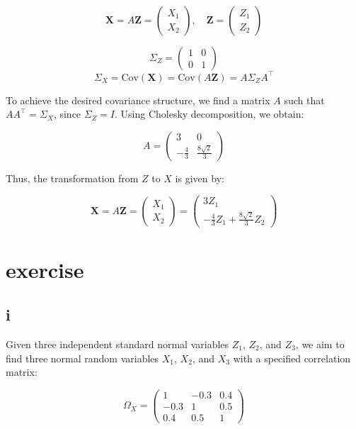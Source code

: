 \documentclass{article}
\begin{document}
\[
    \mathbf{X} = A \mathbf Z = \begin{pmatrix} X_1 \\ X_2 \end{pmatrix}, \quad \mathbf Z = \begin{pmatrix} Z_1 \\ Z_2 \end{pmatrix}
\]

\[
    \Sigma_Z = \begin{pmatrix} 1 & 0 \\ 0 & 1 \end{pmatrix}
\]
\[
    \Sigma_X = \text{Cov}(\mathbf X) = \text{Cov}(A \mathbf Z) = A \Sigma_Z A^\top
\]

To achieve the desired covariance structure,
we find a matrix $A$ such that $AA^\top = \Sigma_X$, since \(\Sigma_Z = I\).
Using Cholesky decomposition, we obtain:

\[
    A = \begin{pmatrix} 3 & 0 \\ -\frac{4}{3} & \frac{8\sqrt{2}}{3} \end{pmatrix}
\]

Thus, the transformation from $Z$ to $X$ is given by:

\[
    \mathbf X = A \mathbf Z = \begin{pmatrix} X_1 \\ X_2 \end{pmatrix}=\begin{pmatrix} 3Z_1 \\ -\frac{4}{3}Z_1 + \frac{8\sqrt{2}}{3}Z_2 \end{pmatrix}
\]

\section{exercise}
\subsection*{i}
Given three independent standard normal variables \(Z_1\), \(Z_2\),
and \(Z_3\), we aim to find three normal random variables \(X_1\), \(X_2\),
and \(X_3\) with a specified correlation matrix:

\[
    \Omega_X = \begin{pmatrix}
        1    & -0.3 & 0.4 \\
        -0.3 & 1    & 0.5 \\
        0.4  & 0.5  & 1
    \end{pmatrix}
\]
\end{document}
